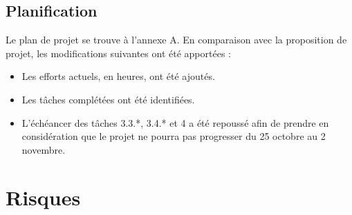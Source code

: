\documentclass[a4paper, oneside, 12pt, titlepage]{article}
\begin{document}
\subsection{Planification}


Le plan de projet se trouve à l'annexe A. En comparaison avec la proposition de projet, les
modifications suivantes ont été apportées :

\begin{itemize}
  \item Les efforts actuels, en heures, ont été ajoutés.
  \item Les tâches complétées ont été identifiées.
  \item L'échéancer des tâches 3.3.*, 3.4.* et 4 a été repoussé afin de prendre en considération que
    le projet ne pourra pas progresser du 25 octobre au 2 novembre.
\end{itemize}

\section{Risques}

%
%
\end{document}
